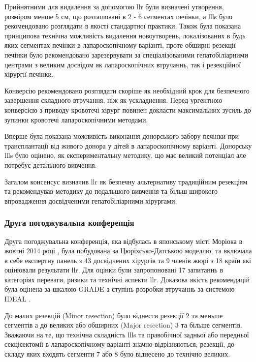 \begin{refsection}
Прийнятними для видалення за допомогою \acrshort{llr} були визначені утворення, розміром менше 5 см, що розташовані в 2 - 6 сегментах печінки, а \acrshort{llls} було рекомендовано розглядати в якості стандартної практики. Також була показана принципова технічна можливість видалення новоутворень, локалізованих в будь яких сегментах печінки в лапароскопічному варіанті, проте обширні резекції печінки було рекомендовано зарезервувати за спеціалізованими гепатобіліарними центрами з великим досвідом як лапароскопічних втручаннь, так і резекційної хірургії печінки. 

Конверсію рекомендовано розглядати скоріше як необхідний крок для безпечного завершення складного втручання, ніж як ускладнення. Перед ургентною конверсією з приводу кровотечі хірург повинен докласти максимальних зусиль до зупинки кровотечі лапароскопічними методами. 

Вперше була показана можливість виконання донорського забору печінки при трансплантації від живого донора у дітей в лапароскопічному варіанті. Донорську \acrshort{llls} було оцінено, як експериментальну методику, що має великий потенціал але потребує детального вивчення. 

Загалом консенсус визначив \acrshort{llr} як безпечну альтернативу традиційним резекціям та рекомендував методику до подальшого вивчення та більш широкого впровадження досвідченими гепатобіліарними хірургами.

\subsubsection{Друга погоджувальна конференція} 

Друга погоджувальна конференція, яка відбулась в японському місті Моріока в жовтні 2014 році \cite{Kaneko2015}, була побудована за Цюріхсько-Датською моделлю, та включала в себе експертну панель з 43 досвідчених хірургів та 9 членів жюрі з 18 країн які оцінювали результати \acrshort{llr}. Для оцінки були запропоновані 17 запитаннь в категоріях переваги, ризики та технічні аспекти \acrshort{llr}. Доказова якість рекомендацій була оцінена за шкалою GRADE а ступінь розробки втручаннь за системою IDEAL \cite{Guyatt2008, McCulloch2009}. 

До малих резекцій (Minor resection) було віднести резекції 2 та меньше сегментів а до великих або обширних (Major resection) 3 та більше сегментів. Зважаючи на те, що технічна складність \acrshort{llls} та правобічної задньої або передньої секцієектомії в лапароскопічному варіанті значно відрізняються, резекції, до складу яких входять сегменти 7 або 8 було віднесено до технічно великих. 


\end{refsection}
